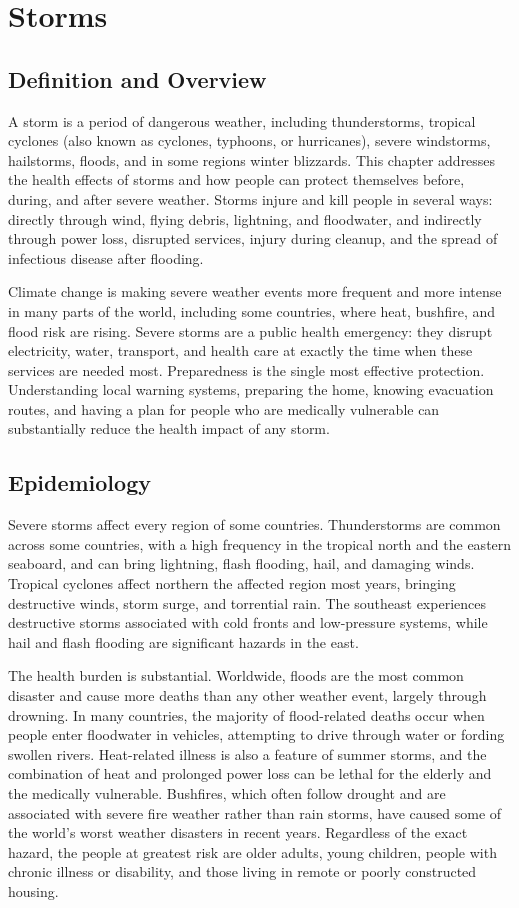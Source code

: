 \chapter{Storms}

\section*{Definition and Overview}
A storm is a period of dangerous weather, including thunderstorms, tropical cyclones (also known as cyclones, typhoons, or hurricanes), severe windstorms, hailstorms, floods, and in some regions winter blizzards. This chapter addresses the health effects of storms and how people can protect themselves before, during, and after severe weather. Storms injure and kill people in several ways: directly through wind, flying debris, lightning, and floodwater, and indirectly through power loss, disrupted services, injury during cleanup, and the spread of infectious disease after flooding.

Climate change is making severe weather events more frequent and more intense in many parts of the world, including some countries, where heat, bushfire, and flood risk are rising. Severe storms are a public health emergency: they disrupt electricity, water, transport, and health care at exactly the time when these services are needed most. Preparedness is the single most effective protection. Understanding local warning systems, preparing the home, knowing evacuation routes, and having a plan for people who are medically vulnerable can substantially reduce the health impact of any storm.

\section*{Epidemiology}
Severe storms affect every region of some countries. Thunderstorms are common across some countries, with a high frequency in the tropical north and the eastern seaboard, and can bring lightning, flash flooding, hail, and damaging winds. Tropical cyclones affect northern the affected region most years, bringing destructive winds, storm surge, and torrential rain. The southeast experiences destructive storms associated with cold fronts and low-pressure systems, while hail and flash flooding are significant hazards in the east.

The health burden is substantial. Worldwide, floods are the most common disaster and cause more deaths than any other weather event, largely through drowning. In many countries, the majority of flood-related deaths occur when people enter floodwater in vehicles, attempting to drive through water or fording swollen rivers. Heat-related illness is also a feature of summer storms, and the combination of heat and prolonged power loss can be lethal for the elderly and the medically vulnerable. Bushfires, which often follow drought and are associated with severe fire weather rather than rain storms, have caused some of the world's worst weather disasters in recent years. Regardless of the exact hazard, the people at greatest risk are older adults, young children, people with chronic illness or disability, and those living in remote or poorly constructed housing.

